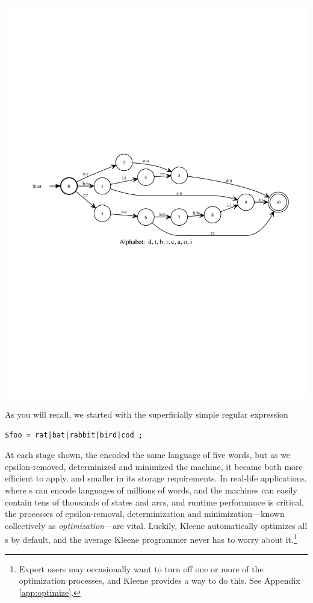 \begin{center}
\includegraphics[width=135mm]{images/minimized.pdf}
\end{center}

As you will recall, we started with the superficially simple regular
expression


\begin{Verbatim}
$foo = rat|bat|rabbit|bird|cod ;
\end{Verbatim}

\noindent
At each stage shown, the \fsm{} encoded the same language of five words, but
as we epsilon-removed, determinized and minimized the machine, it became
both more efficient to apply, and smaller in its storage requirements.  In
real-life applications, where \fsm{}s can encode languages of millions of words, and the
machines can easily contain tens of thousands of states and arcs, and
runtime performance is critical, the
processes of epsilon-removal, determinization and minimization---known
collectively as \emph{optimization}---are vital.  Luckily, Kleene
automatically optimizes all \fsm{}s by default, and the average Kleene
programmer never has to worry about it.\footnote{Expert users may occasionally
want to turn off one or more of the optimization processes, and Kleene provides
a way to do this.  See Appendix \ref{app:optimize}.} 

